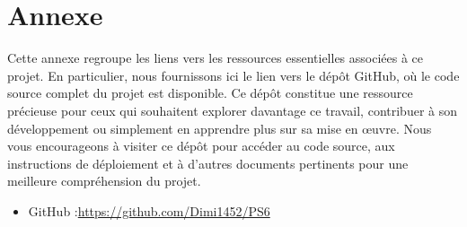 \section{Annexe}
Cette annexe regroupe les liens vers les ressources essentielles associées à ce projet. En particulier, nous fournissons ici le lien vers le dépôt GitHub, où le code source complet du projet est disponible. Ce dépôt constitue une ressource précieuse pour ceux qui souhaitent explorer davantage ce travail, contribuer à son développement ou simplement en apprendre plus sur sa mise en œuvre. Nous vous encourageons à visiter ce dépôt pour accéder au code source, aux instructions de déploiement et à d'autres documents pertinents pour une meilleure compréhension du projet.\\



\begin{itemize}
	\item GitHub :\url{https://github.com/Dimi1452/PS6}\\
\end{itemize} 

